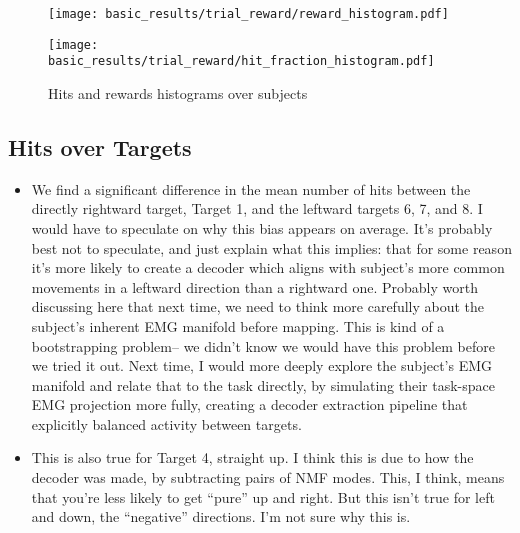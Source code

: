 \documentclass[../main.tex]{subfiles}
\begin{document}
\begin{figure}
    \centering
    \begin{minipage}{0.49\textwidth}
        \texttt{[image: basic\_results/trial\_reward/reward\_histogram.pdf]}
        \subcaption{}
    \end{minipage}
    \begin{minipage}{0.49\textwidth}
        \texttt{[image: basic\_results/trial\_reward/hit\_fraction\_histogram.pdf]}
      \subcaption{}
    \end{minipage}
    \caption[Hit and reward histograms]{Hits and rewards histograms over subjects}\label{fig:reward_histograms}
\end{figure}



\subsection{Hits over Targets}

\begin{itemize}
    \setlength\itemsep{0em}
    \item We find a significant difference in the mean number of hits between the directly rightward target, Target 1, and the leftward targets 6, 7, and 8. I would have to speculate on why this bias appears on average. It's probably best not to speculate, and just explain what this implies: that for some reason it's more likely to create a decoder which aligns with subject's more common movements in a leftward direction than a rightward one. Probably worth discussing here that next time, we need to think more carefully about the subject's inherent EMG manifold before mapping. This is kind of a bootstrapping problem-- we didn't know we would have this problem before we tried it out. Next time, I would more deeply explore the subject's EMG manifold and relate that to the task directly, by simulating their task-space EMG projection more fully, creating a decoder extraction pipeline that explicitly balanced activity between targets. 
    \item This is also true for Target 4, straight up. I think this is due to how the decoder was made, by subtracting pairs of NMF modes. This, I think, means that you're less likely to get ``pure'' up and right. But this isn't true for left and down, the ``negative'' directions. I'm not sure why this is.
\end{itemize}
\end{document}
